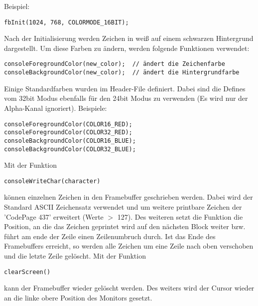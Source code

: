 \documentclass[a4paper,10pt]{scrartcl}
\begin{document}
Beispiel:
\begin{verbatim} 
fbInit(1024, 768, COLORMODE_16BIT);
\end{verbatim}
Nach der Initialisierung werden Zeichen in weiß auf einem schwarzen Hintergrund
dargestellt. Um
diese Farben zu ändern, werden folgende Funktionen verwendet:
\begin{verbatim} 
consoleForegroundColor(new_color);  // ändert die Zeichenfarbe
consoleBackgroundColor(new_color);  // ändert die Hintergrundfarbe
\end{verbatim}
Einige Standardfarben wurden im Header-File definiert. Dabei sind die Defines
vom 32bit Modus
ebenfalls für den 24bit Modus zu verwenden (Es wird nur der Alpha-Kanal
ignoriert).
Beispiele:
\begin{verbatim} 
consoleForegroundColor(COLOR16_RED);
consoleForegroundColor(COLOR32_RED);
consoleBackgroundColor(COLOR16_BLUE);
consoleBackgroundColor(COLOR32_BLUE);
\end{verbatim}
Mit der Funktion 
\begin{verbatim} 
consoleWriteChar(character)
\end{verbatim}
können einzelnen Zeichen in den
Framebuffer geschrieben
werden. Dabei wird der Standard ASCII Zeichensatz verwendet und um weitere
printbare Zeichen der 'CodePage 437' erweitert (Werte $>$ 127). Des weiteren
setzt die Funktion die Position, an die das Zeichen
geprintet wird auf den nächsten Block weiter bzw. führt am ende der Zeile einen
Zeilenumbruch durch.
Ist das Ende des Framebuffers erreicht, so werden alle Zeichen um eine Zeile
nach oben verschoben und die letzte Zeile gelöscht.
Mit der Funktion
\begin{verbatim} 
clearScreen()
\end{verbatim}
kann der Framebuffer wieder gelöscht werden. Des weiters wird der Cursor wieder
an die linke obere Position des Monitors gesetzt.
\end{document}
